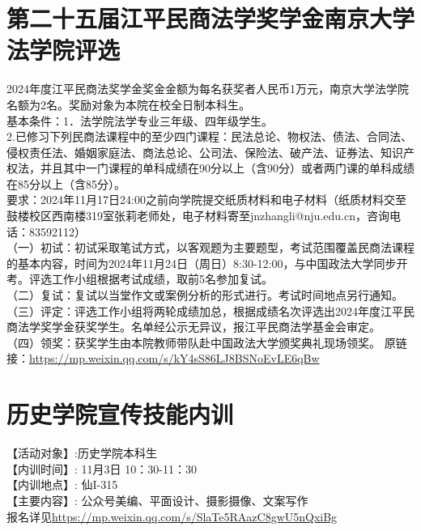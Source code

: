 \documentclass[letterpaper, 12pt]{article}
\begin{document}
\begin{multicols}{2}
\section{第二十五届江平民商法学奖学金南京大学法学院评选}
2024年度江平民商法奖学金奖金金额为每名获奖者人民币1万元，南京大学法学院名额为2名。奖励对象为本院在校全日制本科生。\\
基本条件：1．法学院法学专业三年级、四年级学生。\\
2.已修习下列民商法课程中的至少四门课程：民法总论、物权法、债法、合同法、侵权责任法、婚姻家庭法、商法总论、公司法、保险法、破产法、证券法、知识产权法，并且其中一门课程的单科成绩在90分以上（含90分）或者两门课的单科成绩在85分以上（含85分）。\\
要求：2024年11月17日24:00之前向学院提交纸质材料和电子材料（纸质材料交至鼓楼校区西南楼319室张莉老师处，电子材料寄至jnzhangli@nju.edu.cn，咨询电话：83592112）\\
（一）初试：初试采取笔试方式，以客观题为主要题型，考试范围覆盖民商法课程的基本内容，时间为2024年11月24日（周日）8:30-12:00，与中国政法大学同步开考。评选工作小组根据考试成绩，取前5名参加复试。\\
（二）复试：复试以当堂作文或案例分析的形式进行。考试时间地点另行通知。\\
（三）评定：评选工作小组将两轮成绩加总，根据成绩名次评选出2024年度江平民商法学奖学金获奖学生。名单经公示无异议，报江平民商法学基金会审定。\\
（四）领奖：获奖学生由本院教师带队赴中国政法大学颁奖典礼现场领奖。
原链接：\url{https://mp.weixin.qq.com/s/kY4sS86LJ8BSNoEvLE6qBw}


\section{历史学院宣传技能内训}
【活动对象】:历史学院本科生\\
【内训时间】: 11月3日 10：30-11：30\\
【内训地点】: 仙I-315\\
【主要内容】: 公众号美编、平面设计、摄影摄像、文案写作\\
报名详见\url{https://mp.weixin.qq.com/s/SlaTe5RAazC8gwU5nQxiBg}


\end{multicols}
\end{document}
